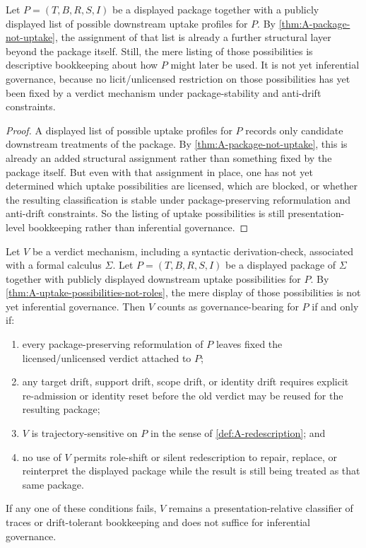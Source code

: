 \begin{theorem}
\label{thm:A-uptake-possibilities-not-roles}
Let $P=(T,B,R,S,I)$ be a displayed package together with a publicly displayed list of possible downstream uptake profiles for $P$. By \cref{thm:A-package-not-uptake}, the assignment of that list is already a further structural layer beyond the package itself. Still, the mere listing of those possibilities is descriptive bookkeeping about how $P$ might later be used. It is not yet inferential governance, because no licit/unlicensed restriction on those possibilities has yet been fixed by a verdict mechanism under package-stability and anti-drift constraints.
\end{theorem}

\begin{proof}
A displayed list of possible uptake profiles for $P$ records only candidate downstream treatments of the package. By \cref{thm:A-package-not-uptake}, this is already an added structural assignment rather than something fixed by the package itself. But even with that assignment in place, one has not yet determined which uptake possibilities are licensed, which are blocked, or whether the resulting classification is stable under package-preserving reformulation and anti-drift constraints. So the listing of uptake possibilities is still presentation-level bookkeeping rather than inferential governance.
\end{proof}

\begin{theorem}
\label{thm:A-realization-criterion}
Let $V$ be a verdict mechanism, including a syntactic derivation-check, associated with a formal calculus $\Sigma$. Let $P=(T,B,R,S,I)$ be a displayed package of $\Sigma$ together with publicly displayed downstream uptake possibilities for $P$. By \cref{thm:A-uptake-possibilities-not-roles}, the mere display of those possibilities is not yet inferential governance. Then $V$ counts as governance-bearing for $P$ if and only if:
\begin{enumerate}[label=(\roman*), leftmargin=2.5em]
    \item every package-preserving reformulation of $P$ leaves fixed the licensed/unlicensed verdict attached to $P$;
    \item any target drift, support drift, scope drift, or identity drift requires explicit re-admission or identity reset before the old verdict may be reused for the resulting package;
    \item $V$ is trajectory-sensitive on $P$ in the sense of \cref{def:A-redescription}; and
    \item no use of $V$ permits role-shift or silent redescription to repair, replace, or reinterpret the displayed package while the result is still being treated as that same package.
\end{enumerate}
If any one of these conditions fails, $V$ remains a presentation-relative classifier of traces or drift-tolerant bookkeeping and does not suffice for inferential governance.
\end{theorem}

